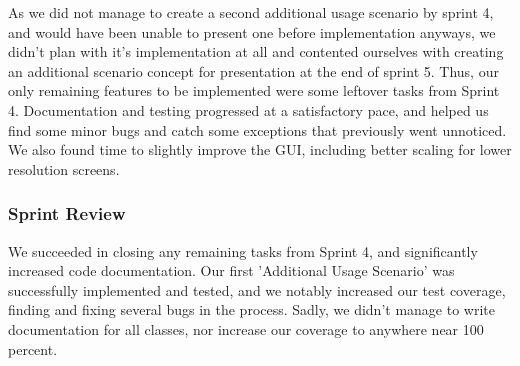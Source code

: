 As we did not manage to create a second additional usage scenario by sprint 4, and would have been unable to present one before implementation anyways, we didn't plan with it's implementation at all and contented ourselves with creating an additional scenario concept for presentation at the end of sprint 5. 
Thus, our only remaining features to be implemented were some leftover tasks from Sprint 4.
Documentation and testing progressed at a satisfactory pace, and helped us find some minor bugs and catch some exceptions that previously went unnoticed. We also found time to slightly improve the GUI, including better scaling for lower resolution screens.

\subsubsection*{Sprint Review}

We succeeded in closing any remaining tasks from Sprint 4, and significantly increased code documentation. 
Our first 'Additional Usage Scenario' was successfully implemented and tested, and we notably increased our test coverage, finding and fixing several bugs in the process. 
Sadly, we didn't manage to write documentation for all classes, nor increase our coverage to anywhere near 100 percent. 
